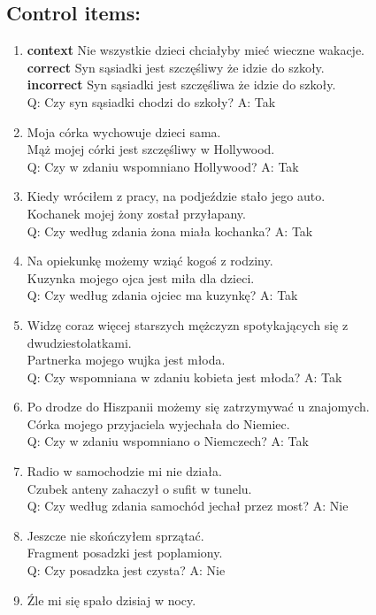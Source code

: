 \subsection*{Control items:}
\begin{enumerate}
\item \textbf{context} Nie wszystkie dzieci chciałyby mieć wieczne wakacje.\\
  \textbf{correct} Syn sąsiadki jest szczęśliwy że idzie do szkoły.\\
  \textbf{incorrect} Syn sąsiadki jest szczęśliwa że idzie do szkoły.\\
	Q: Czy syn sąsiadki chodzi do szkoły? A: Tak
\item Moja córka wychowuje dzieci sama.\\
	Mąż mojej córki jest szczęśliwy w Hollywood.\\
	Q: Czy w zdaniu wspomniano Hollywood? A: Tak
\item Kiedy wróciłem z pracy, na podjeździe stało jego auto.\\
	Kochanek mojej żony został przyłapany.\\
	Q: Czy według zdania żona miała kochanka? A: Tak
\item Na opiekunkę możemy wziąć kogoś z rodziny.\\
	Kuzynka mojego ojca jest miła dla dzieci.\\
	Q: Czy według zdania ojciec ma kuzynkę? A: Tak
\item Widzę coraz więcej starszych mężczyzn spotykających się z dwudziestolatkami.\\
	Partnerka mojego wujka jest młoda.\\
	Q: Czy wspomniana w zdaniu kobieta jest młoda? A: Tak
\item Po drodze do Hiszpanii możemy się zatrzymywać u znajomych.\\
	Córka mojego przyjaciela wyjechała do Niemiec.\\
	Q: Czy w zdaniu wspomniano o Niemczech? A: Tak
\item Radio w samochodzie mi nie działa.\\
	Czubek anteny zahaczył o sufit w tunelu.\\
	Q: Czy według zdania samochód jechał przez most? A: Nie
\item Jeszcze nie skończyłem sprzątać.\\
	Fragment posadzki jest poplamiony.\\
	Q: Czy posadzka jest czysta? A: Nie
\item Źle mi się spało dzisiaj w nocy.\\

\end{enumerate}

